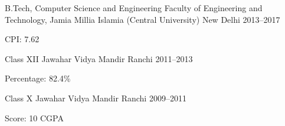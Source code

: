 
\begin{cventries}

\cventry%
  {B.Tech, Computer Science and Engineering} %
  {Faculty of Engineering and Technology, Jamia Millia Islamia (Central
   University)} %
  {New Delhi} %
  {2013--2017} %
  {%
    \begin{cvitems}%
      \item{CPI: 7.62}
    \end{cvitems}
  }

\cventry%
  {Class XII} %
  {Jawahar Vidya Mandir} %
  {Ranchi} %
  {2011--2013} %
  {%
    \begin{cvitems} %
      \item{Percentage: 82.4\%}
    \end{cvitems}
  }

\cventry%
  {Class X} %
  {Jawahar Vidya Mandir} %
  {Ranchi} %
  {2009--2011} %
  {%
    \begin{cvitems} %
      \item{Score: 10 CGPA}
    \end{cvitems}
  }

\end{cventries}
